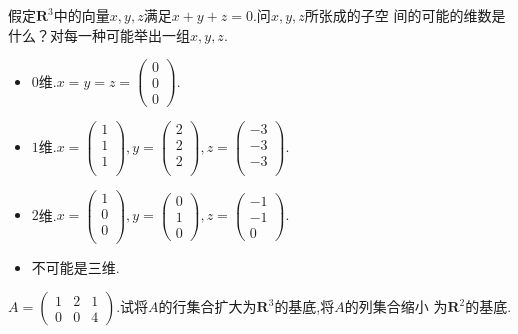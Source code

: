 ﻿\documentclass{book} \usepackage{exsheets} \usepackage{xeCJK}
\begin{document}
\begin{question}
  假定$\mathbf{R}^3$中的向量$x,y,z$满足$x+y+z=0$.问$x,y,z$所张成的子空
  间的可能的维数是什么？对每一种可能举出一组$x,y,z$.
\end{question}
\begin{solution}
  \begin{itemize}
  \item     $0$维.$x=y=z=
    \begin{pmatrix}
      0\\
      0\\
      0
    \end{pmatrix}
    $.
  \item     $1$维.$x=
    \begin{pmatrix}
      1\\
      1\\
      1\\
    \end{pmatrix},y=
    \begin{pmatrix}
      2\\
      2\\
      2\\
    \end{pmatrix},z=
    \begin{pmatrix}
      -3\\
      -3\\
      -3\\
    \end{pmatrix}
    $.
  \item     $2$维.$x=
    \begin{pmatrix}
      1\\
      0\\
      0\\
    \end{pmatrix},y=
    \begin{pmatrix}
      0\\
      1\\
      0
    \end{pmatrix},z=
    \begin{pmatrix}
      -1\\
      -1\\
      0
    \end{pmatrix}.  $
  \item     不可能是三维.
  \end{itemize}
\end{solution}
\begin{question}
  $A=
  \begin{pmatrix}
    1&2&1\\
    0&0&4
  \end{pmatrix}.
  $试将$A$的行集合扩大为$\mathbf{R}^3$的基底,将$A$的列集合缩小
  为$\mathbf{R}^2$的基底.
\end{question}
\end{document}
